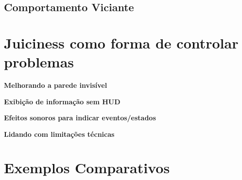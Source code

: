 \expandafter\documentclass\expandafter[table, usenames, svgnames, dvipsnames, \classopts]{beamer}
\begin{document}
\subsection{Comportamento Viciante}

\section{Juiciness como forma de controlar problemas}

\begin{frame}{\textbf{Melhorando a parede invisível}}

\end{frame}

\begin{frame}{\textbf{Exibição de informação sem HUD}}

\end{frame}

\begin{frame}{\textbf{Efeitos sonoros para indicar eventos/estados}}

\end{frame}

\begin{frame}{\textbf{Lidando com limitações técnicas}}


\end{frame}

\section{Exemplos Comparativos}
\end{document}
